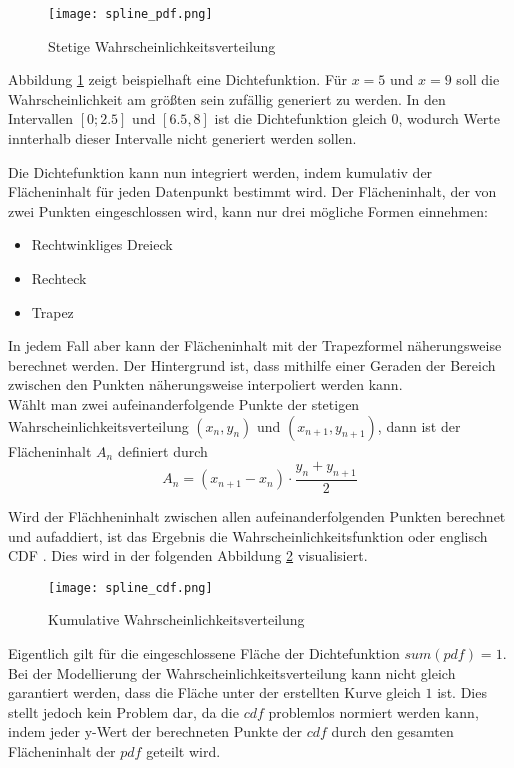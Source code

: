 \begin{figure}[H]
    \centering
    \texttt{[image: spline\_pdf.png]}
    \caption{Stetige Wahrscheinlichkeitsverteilung}\label{fig:pdf}
\end{figure}

Abbildung \ref{fig:pdf} zeigt beispielhaft eine Dichtefunktion. Für $x=5$ und $x=9$ soll die Wahrscheinlichkeit am größten sein zufällig generiert zu werden. In den Intervallen $[0;2.5]$ und $[6.5,8]$ ist die Dichtefunktion gleich $0$, wodurch Werte innterhalb dieser Intervalle nicht generiert werden sollen.

Die Dichtefunktion kann nun integriert werden, indem kumulativ der Flächeninhalt für jeden Datenpunkt bestimmt wird. Der Flächeninhalt, der von zwei Punkten eingeschlossen wird, kann nur drei mögliche Formen einnehmen:
\begin{itemize}
    \item Rechtwinkliges Dreieck
    \item Rechteck
    \item Trapez
\end{itemize}
In jedem Fall aber kann der Flächeninhalt mit der Trapezformel näherungsweise berechnet werden. Der Hintergrund ist, dass mithilfe einer Geraden der Bereich zwischen den Punkten näherungsweise interpoliert werden kann.\\
Wählt man zwei aufeinanderfolgende Punkte der stetigen Wahrscheinlichkeitsverteilung $(x_n,y_n)$ und $(x_{n+1},y_{n+1})$, dann ist der Flächeninhalt $A_n$ definiert durch
$$A_n=(x_{n+1}-x_n) \cdot \frac{y_n+y_{n+1}}{2}$$

Wird der Flächheninhalt zwischen allen aufeinanderfolgenden Punkten berechnet und aufaddiert, ist das Ergebnis die Wahrscheinlichkeitsfunktion oder englisch \ac{CDF} \cite{denker:2008}. Dies wird in der folgenden Abbildung \ref{fig:cdf} visualisiert.

\begin{figure}[H]
    \centering
    \texttt{[image: spline\_cdf.png]}
    \caption{Kumulative Wahrscheinlichkeitsverteilung}\label{fig:cdf}
\end{figure}

Eigentlich gilt für die eingeschlossene Fläche der Dichtefunktion $sum(pdf)=1$. Bei der Modellierung der Wahrscheinlichkeitsverteilung kann nicht gleich garantiert werden, dass die Fläche unter der erstellten Kurve gleich $1$ ist. Dies stellt jedoch kein Problem dar, da die $cdf$ problemlos normiert werden kann, indem jeder y-Wert der berechneten Punkte der $cdf$ durch den gesamten Flächeninhalt der $pdf$ geteilt wird.

